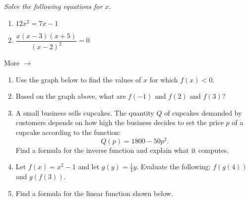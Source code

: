 \documentclass[11pt]{article}
\begin{document}
\noindent
\textit{Solve the following equations for $x$.} 
\begin{multicols}{2}
\begin{enumerate}
\setcounter{enumi}{\theenumCount}
\item $12x^2   = 7x - 1$
\item $\dfrac{x(x-3)(x+5)}{(x-2)^2} = 0$
\setcounter{enumCount}{\theenumi}
\end{enumerate}
\end{multicols}
\vfill


\hfill More $\longrightarrow$

\newpage

\begin{enumerate}
\setcounter{enumi}{\theenumCount}

\item Use the graph below to find the values of $x$ for which $f(x) < 0.$ 

\begin{flushright}
\end{flushright}

\item Based on the graph above, what are $f(-1)$ and $f(2)$ and $f(3)$?
\vfill


\item A small business sells cupcakes.  The quantity $Q$ of cupcakes demanded by customers depends on how high the business decides to set the price $p$ of a cupcake according to the function:
$$Q(p) = 1800 - 50p^2.$$
Find a formula for the inverse function and explain what it computes. 
\vfill 


\item Let $f(x) = x^2 - 1$ and let $g(y) = \frac{1}{4}y$.  Evaluate the following: $f(g(4))$ and $g(f(3))$.  
\vfill

\item Find a formula for the linear function shown below.
\begin{flushright}
\end{flushright}


\end{enumerate}
\end{document}
